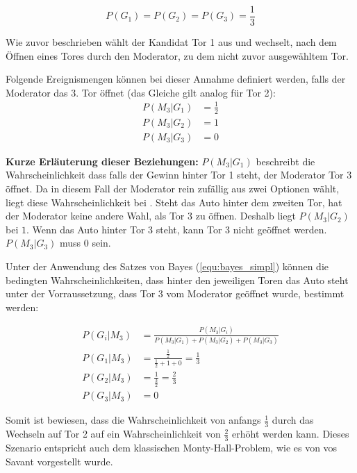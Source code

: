 \begin{equation*}
    P(G_1)=P(G_2)=P(G_3)=\frac{1}{3}
\end{equation*}

Wie zuvor beschrieben wählt der Kandidat Tor 1 aus und wechselt, nach dem Öffnen eines Tores durch den Moderator, zu dem nicht zuvor ausgewähltem Tor.

Folgende Ereignismengen können bei dieser Annahme definiert werden, falls der Moderator das 3. Tor öffnet (das Gleiche gilt analog für Tor 2):
\begin{align*}
    P(M_3 | G_1) & = \frac{1}{2} \\
    P(M_3 | G_2) & = 1           \\
    P(M_3 | G_3) & = 0
\end{align*}

\textbf{Kurze Erläuterung dieser Beziehungen:} $P(M_3 | G_1)$ beschreibt die Wahrscheinlichkeit dass falls der Gewinn hinter Tor 1 steht, der Moderator Tor 3 öffnet. Da in diesem Fall der Moderator rein zufällig aus zwei Optionen wählt, liegt diese Wahrscheinlichkeit bei . Steht das Auto hinter dem zweiten Tor, hat der Moderator keine andere Wahl, als Tor 3 zu öffnen. Deshalb liegt $P(M_3 | G_2)$ bei $1$. Wenn das Auto hinter Tor 3 steht, kann Tor 3 nicht geöffnet werden. $P(M_3 | G_3)$ muss $0$ sein.

Unter der Anwendung des Satzes von Bayes (\autoref{equ:bayes_simpl}) können die bedingten Wahrscheinlichkeiten, dass hinter den jeweiligen Toren das Auto steht unter der Vorraussetzung, dass Tor 3 vom Moderator geöffnet wurde, bestimmt werden:

\begin{align*}
    P(G_i | M_3) & = \frac{P(M_3 | G_i)}{P(M_3 | G_1) +
    P(M_3 | G_2) + P(M_3 | G_3)}                                       \\
    P(G_1 | M_3) & = \frac{\frac{1}{2}}{\frac{1}{2}+1+0} = \frac{1}{3} \\
    P(G_2 | M_3) & = \frac{1}{\frac{3}{2}} = \frac{2}{3}               \\
    P(G_3 | M_3) & = 0
\end{align*}

Somit ist bewiesen, dass die Wahrscheinlichkeit von anfangs $\frac{1}{3}$ durch das Wechseln auf Tor 2 auf ein Wahrscheinlichkeit von $\frac{2}{3}$ erhöht werden kann. Dieses Szenario entspricht auch dem klassischen Monty-Hall-Problem, wie es von vos Savant vorgestellt wurde.


